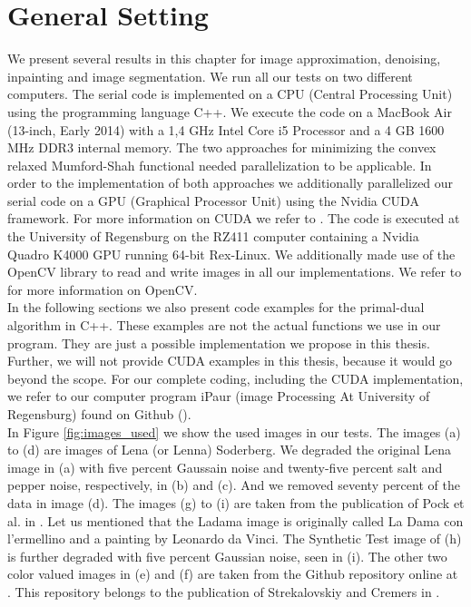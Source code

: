 \documentclass[abstracton]{scrreprt}
\begin{document}
    \section{General Setting} %
    \label{sec:general_setting}
        
        We present several results in this chapter for image approximation, denoising, inpainting and image segmentation. We run all our tests on two different computers. The serial code is implemented on a CPU (Central Processing Unit) using the programming language C++. We execute the code on a MacBook Air (13-inch, Early 2014) with a 1,4 GHz Intel Core i5 Processor and a 4 GB 1600 MHz DDR3 internal memory. The two approaches for minimizing the convex relaxed Mumford-Shah functional needed parallelization to be applicable. In order to the implementation of both approaches we additionally parallelized our serial code on a GPU (Graphical Processor Unit) using the Nvidia CUDA framework. For more information on CUDA we refer to \cite{CUDA}. The code is executed at the University of Regensburg on the RZ411 computer containing a Nvidia Quadro K4000 GPU running 64-bit Rex-Linux. We additionally made use of the OpenCV library to read and write images in all our implementations. We refer to \cite{OpenCV} for more information on OpenCV.\\
        In the following sections we also present code examples for the primal-dual algorithm in C++. These examples are not the actual functions we use in our program. They are just a possible implementation we propose in this thesis. Further, we will not provide CUDA examples in this thesis, because it would go beyond the scope. For our complete coding, including the CUDA implementation, we refer to our computer program iPaur (image Processing At University of Regensburg) found on Github (\cite{Bauer}).\\
        In Figure \ref{fig:images_used} we show the used images in our tests. The images (a) to (d) are images of Lena (or Lenna) Soderberg. We degraded the original Lena image in (a) with five percent Gaussain noise and twenty-five percent salt and pepper noise, respectively, in (b) and (c). And we removed seventy percent of the data in image (d). The images (g) to (i) are taken from the publication of Pock et al. in \cite{Pock-et-al-iccv09}. Let us mentioned that the Ladama image is originally called La Dama con l'ermellino and a painting by Leonardo da Vinci. The Synthetic Test image of (h) is further degraded with five percent Gaussian noise, seen in (i). The other two color valued images in (e) and (f) are taken from the Github repository online at \cite{FastMS}. This repository belongs to the publication of Strekalovskiy and Cremers in \cite{Strekalovskiy-Cremers-eccv14}.\\
\end{document}
